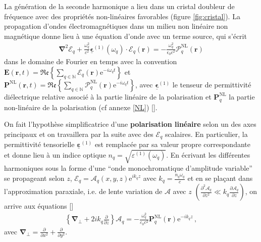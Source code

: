 \documentclass[11pt,a4paper]{article}
\newcommand{\ncite}[1]{[\citenum{#1}]}
\newcommand{\pdv}[2]{\frac{\partial #1}{\partial #2}}
\newcommand{\E}{\mathcal{E}}
\newcommand{\A}{\mathcal{A}}
\newcommand{\e}[1]{\text{e}^{#1}}
\newcommand{\mathsc}[1]{\mathrm{\scriptscriptstyle {#1}}}
\renewcommand{\v}[1]{\boldsymbol{\mathbf{#1}}}
\newcommand{\tens}[1]{\boldsymbol{\underline{#1}}}
\begin{document}
La génération de la seconde harmonique a lieu dans un cristal doubleur de fréquence avec des propriétés non-linéaires favorables (figure \ref{fig:cristal}).
La propagation d'ondes électromagnétiques dans un milieu non linéaire non magnétique donne lieu à une équation d'onde avec un terme source, qui s'écrit 
\begin{align}
\boldsymbol{\nabla}^2 \boldsymbol{\E}_q + \frac{\omega_q^2}{c^2}\tens\epsilon^{(1)}(\omega_q)\cdot \v \E_q(\v r) = - \frac{\omega_q^2}{\epsilon_0 c^2} \boldsymbol{\mathcal{P}}^\mathsc{NL}_q(\v r)
\end{align}
dans le domaine de Fourier en temps avec la convention $\v E(\v r, t) = \mathfrak{Re} \left\{ \sum_{q \in \mathbb N} \v {\boldsymbol{\mathcal E}}_q (\v r) \e{-i \omega_q t} \right\}$ et $\v P^\mathsc{NL} (\v r, t) = \mathfrak{Re} \left\{ \sum_{q \in \mathbb N} \v {\boldsymbol{\mathcal P}}^\mathsc{NL}_q (\v r) \e{-i \omega_q t} \right\}
$,
avec $\tens \epsilon^{(1)}$ le tenseur de permittivité diélectrique relative associé à la partie linéaire de la polarisation et $\v P^\mathsc{NL}_q$ la partie non-linéaire de la polarisation (cf annexe \ref{NL}) \ncite{boyd,joffre}.

On fait l'hypothèse simplificatrice d'une \textbf{polarisation linéaire} selon un des axes principaux et on travaillera par la suite avec des $\mathcal E_q$ scalaires. En particulier, la permittivité tensorielle $\tens \varepsilon^{(1)}$ est remplacée par sa valeur propre correspondante et donne lieu à un indice optique $\boxed{ n_q = \sqrt{ \varepsilon^{(1)}(\omega_q)}}$. En écrivant les différentes harmoniques sous la forme d'une ``onde monochromatique d'amplitude variable'' se propageant selon $z$, $\mathcal E_q = \A_q(x,y,z) \e{ik_qz}$ avec $\boxed{k_q =\frac{n_q \omega_q}{c}}$ et en se plaçant dans l'approximation paraxiale, i.e. de lente variation de $\A$ avec $z$ $\left(\frac{\partial^2 \A_q}{\partial z^2} \ll k_q \frac{\partial \A_q}{\partial z}\right)$, on arrive aux équations \ncite{joffre}
\begin{align}  
	\left\{\v\nabla_\bot + 2 i k_q \frac{\partial}{\partial z} \right\} \A_q = - \frac{\omega_q^2}{\varepsilon_0 c^2} \v P^\mathsc{NL}_q (\v r) \e{-ik_qz} \,,
	\label{eq:parax}
\end{align}
avec $\v\nabla_\bot = \pdv{}{x^2} + \pdv{}{y^2}$.
\end{document}
